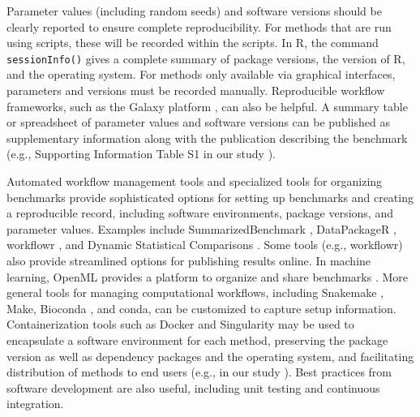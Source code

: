 Parameter values (including random seeds) and software versions should be clearly reported to ensure complete reproducibility. For methods that are run using scripts, these will be recorded within the scripts. In R, the command \texttt{sessionInfo()} gives a complete summary of package versions, the version of R, and the operating system. For methods only available via graphical interfaces, parameters and versions must be recorded manually. Reproducible workflow frameworks, such as the Galaxy platform \cite{afgan_galaxyplatformaccessible_2018}, can also be helpful. A summary table or spreadsheet of parameter values and software versions can be published as supplementary information along with the publication describing the benchmark (e.g., Supporting Information Table S1 in our study \cite{weber_comparisonclusteringmethods_2016}).

Automated workflow management tools and specialized tools for organizing benchmarks provide sophisticated options for setting up benchmarks and creating a reproducible record, including software environments, package versions, and parameter values. Examples include SummarizedBenchmark \cite{kimes_reproduciblereplicablecomparisons_2019}, DataPackageR \cite{finak_datapackagerreproducibledata_2018}, workflowr \cite{blischak_workflowrframeworkreproducible_2019}, and Dynamic Statistical Comparisons \cite{wang_dscdynamicstatistical_2016}. Some tools (e.g., workflowr) also provide streamlined options for publishing results online. In machine learning, OpenML provides a platform to organize and share benchmarks \cite{vanschoren_openmlnetworkedscience_2014}. More general tools for managing computational workflows, including Snakemake \cite{koster_snakemakescalablebioinformatics_2012}, Make, Bioconda \cite{gruning_biocondasustainablecomprehensive_2018}, and conda, can be customized to capture setup information. Containerization tools such as Docker and Singularity may be used to encapsulate a software environment for each method, preserving the package version as well as dependency packages and the operating system, and facilitating distribution of methods to end users (e.g., in our study \cite{saelens_comparisonsinglecelltrajectory_2019}). Best practices from software development are also useful, including unit testing and continuous integration.

